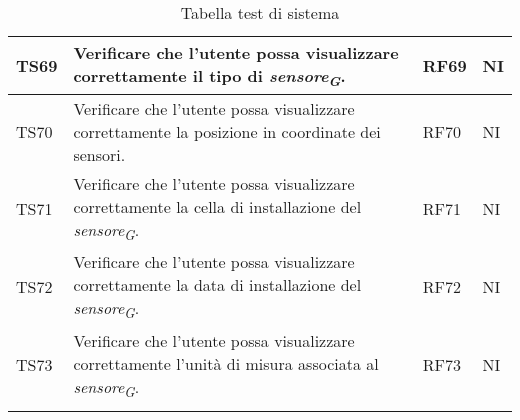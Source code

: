 \begin{longtable}{|C{1.9cm}|L{5cm}|C{2cm}|C{2cm}|}
    TS69 & Verificare che l'utente possa visualizzare correttamente il tipo di \textit{sensore}\textsubscript{\textit{G}}. & RF69 & NI \\
    \hline

    TS70 & Verificare che l'utente possa visualizzare correttamente la posizione in coordinate dei sensori. & RF70 & NI \\
    \hline

    TS71 & Verificare che l'utente possa visualizzare correttamente la cella di installazione del \textit{sensore}\textsubscript{\textit{G}}. & RF71 & NI \\
    \hline

    TS72 & Verificare che l'utente possa visualizzare correttamente la data di installazione del \textit{sensore}\textsubscript{\textit{G}}. & RF72 & NI \\
    \hline

    TS73 & Verificare che l'utente possa visualizzare correttamente l'unità di misura associata al \textit{sensore}\textsubscript{\textit{G}}. & RF73 & NI \\
    \hline

    \caption{Tabella test di sistema}
\end{longtable}

\pagebreak